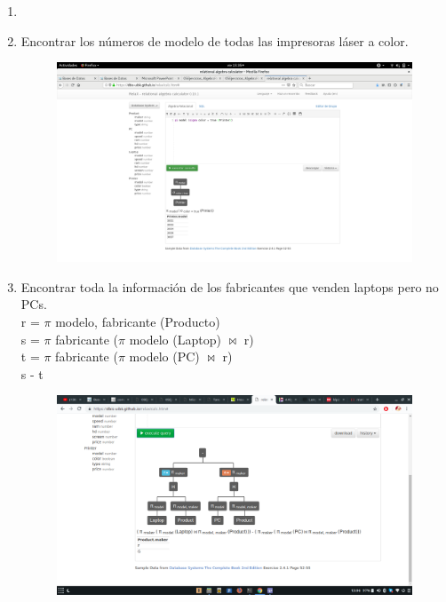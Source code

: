 \documentclass[a4paper, 12pt]{report}
\begin{document}
{\begin{enumerate}[label=\alph*)]
{\begin{figure}[H]
            {img/c.png}\hfill
    \end{figure}
}
\item{}
\item{Encontrar los números de modelo de todas las impresoras láser a color.\\
    \begin{figure}[H]
        \includegraphics[width=\textwidth]
            {img/e.png}\hfill
    \end{figure}
}
\item{Encontrar toda la información de los fabricantes que venden
	laptops pero no PCs.\\
	r = $\pi$ modelo, fabricante (Producto)\\
	s = $\pi$ fabricante ($\pi$ modelo (Laptop) $\Join$ r)\\
	t = $\pi$ fabricante ($\pi$ modelo (PC) $\Join$ r)\\
	s - t\\
    \begin{figure}[H]
        \includegraphics[width=\textwidth]
            {img/f.png}\hfill
    \end{figure}
}
\end{enumerate}}
\end{document}
